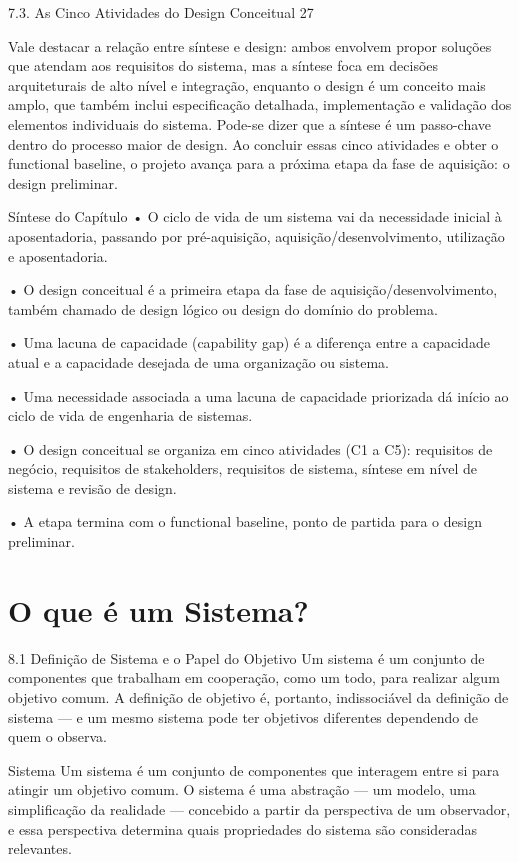 7.3. As Cinco Atividades do Design Conceitual 27

Vale destacar a relação entre síntese e design: ambos envolvem propor soluções que atendam aos requisitos do sistema, mas a síntese foca em decisões arquiteturais de alto nível e integração, enquanto o design é um conceito mais amplo, que também inclui especificação detalhada, implementação e validação dos elementos individuais do sistema. Pode-se dizer que a síntese é um passo-chave dentro do processo maior de design. Ao concluir essas cinco atividades e obter o functional baseline, o projeto avança para a próxima etapa da fase de aquisição: o design preliminar.

Síntese do Capítulo • O ciclo de vida de um sistema vai da necessidade inicial à aposentadoria, passando por pré-aquisição, aquisição/desenvolvimento, utilização e aposentadoria.

• O design conceitual é a primeira etapa da fase de aquisição/desenvolvimento, também chamado de design lógico ou design do domínio do problema.

• Uma lacuna de capacidade (capability gap) é a diferença entre a capacidade atual e a capacidade desejada de uma organização ou sistema.

• Uma necessidade associada a uma lacuna de capacidade priorizada dá início ao ciclo de vida de engenharia de sistemas.

• O design conceitual se organiza em cinco atividades (C1 a C5): requisitos de negócio, requisitos de stakeholders, requisitos de sistema, síntese em nível de sistema e revisão de design.

• A etapa termina com o functional baseline, ponto de partida para o design preliminar.

\chapter{O que é um Sistema?}

8.1 Definição de Sistema e o Papel do Objetivo Um sistema é um conjunto de componentes que trabalham em cooperação, como um todo, para realizar algum objetivo comum. A definição de objetivo é, portanto, indissociável da definição de sistema — e um mesmo sistema pode ter objetivos diferentes dependendo de quem o observa.

Sistema Um sistema é um conjunto de componentes que interagem entre si para atingir um objetivo comum. O sistema é uma abstração — um modelo, uma simplificação da realidade — concebido a partir da perspectiva de um observador, e essa perspectiva determina quais propriedades do sistema são consideradas relevantes.

